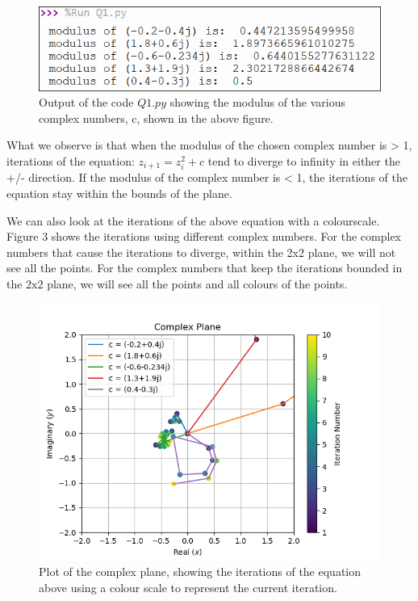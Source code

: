 \documentclass{article}
\begin{document}
\begin{figure}[!ht]
    \centering
    \includegraphics[scale=0.75]{Q1_pic.png}
    \caption{Output of the code $Q1.py$ showing the modulus of the various complex numbers, c, shown in the above figure.}
    \label{fig:Q1_pic.png}
\end{figure}

What we observe is that when the modulus of the chosen complex number is > 1, iterations of the equation: $z_{i + 1} = z_i^2 + c$ tend to diverge to infinity in either the +/- direction. If the modulus of the complex number is < 1, the iterations of the equation stay within the bounds of the plane.

We can also look at the iterations of the above equation with a colourscale. Figure 3 shows the iterations using different complex numbers.
For the complex numbers that cause the iterations to diverge, within the 2x2 plane, we will not see all the points.
For the complex numbers that keep the iterations bounded in the 2x2 plane, we will see all the points and all colours of the points.

\begin{figure}[!ht]
    \centering
    \includegraphics[scale=0.9]{Q1_plot2.png}
    \caption{Plot of the complex plane, showing the iterations of the equation above using a colour scale to represent the current iteration.}
    \label{fig:Q1_plot2.png}
\end{figure}
\end{document}
